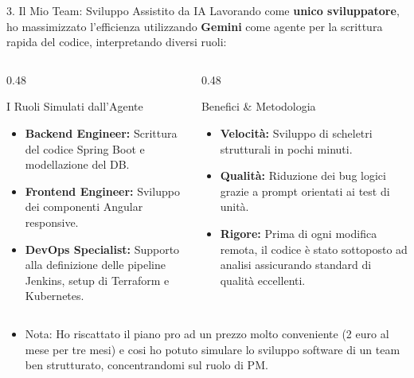 \documentclass[aspectratio=169, 10pt]{beamer}
\begin{document}
\begin{frame}{3. Il Mio Team: Sviluppo Assistito da IA}
  Lavorando come \textbf{unico sviluppatore}, ho massimizzato l'efficienza utilizzando \textbf{Gemini} come agente per la scrittura rapida del codice, interpretando diversi ruoli:
  \vspace{0.2cm}
  \begin{columns}
    \begin{column}{0.48\textwidth}
      \begin{block}{I Ruoli Simulati dall'Agente}
        \begin{itemize}
          \item \textbf{Backend Engineer:} Scrittura del codice Spring Boot e modellazione del DB.
          \item \textbf{Frontend Engineer:} Sviluppo dei componenti Angular responsive.
          \item \textbf{DevOps Specialist:} Supporto alla definizione delle pipeline Jenkins, setup di Terraform e Kubernetes.
        \end{itemize}
      \end{block}
    \end{column}
    \begin{column}{0.48\textwidth}
      \begin{block}{Benefici \& Metodologia}
        \begin{itemize}
          \item \textbf{Velocità:} Sviluppo di scheletri strutturali in pochi minuti.
          \item \textbf{Qualità:} Riduzione dei bug logici grazie a prompt orientati ai test di unità.
          \item \textbf{Rigore:} Prima di ogni modifica remota, il codice è stato sottoposto ad analisi assicurando standard di qualità eccellenti.
        \end{itemize}
      \end{block}
    \end{column}
  \end{columns}
  \begin{itemize}
  \vspace{0.2cm}
      \item Nota: Ho riscattato il piano pro ad un prezzo molto conveniente (2 euro al mese per tre mesi) e cosi ho potuto simulare lo sviluppo software di un team ben strutturato, concentrandomi sul ruolo di PM.
  \end{itemize}
\end{frame}
\end{document}
